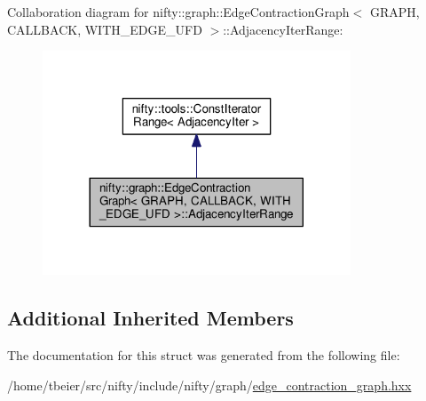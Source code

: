 Collaboration diagram for nifty\+:\+:graph\+:\+:Edge\+Contraction\+Graph$<$ G\+R\+A\+P\+H, C\+A\+L\+L\+B\+A\+C\+K, W\+I\+T\+H\+\_\+\+E\+D\+G\+E\+\_\+\+U\+F\+D $>$\+:\+:Adjacency\+Iter\+Range\+:\nopagebreak
\begin{figure}[H]
\begin{center}
\leavevmode
\includegraphics[width=260pt]{structnifty_1_1graph_1_1EdgeContractionGraph_1_1AdjacencyIterRange__coll__graph}
\end{center}
\end{figure}
\subsection*{Additional Inherited Members}


The documentation for this struct was generated from the following file\+:\begin{DoxyCompactItemize}
\item 
/home/tbeier/src/nifty/include/nifty/graph/\hyperlink{graph_2edge__contraction__graph_8hxx}{edge\+\_\+contraction\+\_\+graph.\+hxx}\end{DoxyCompactItemize}
